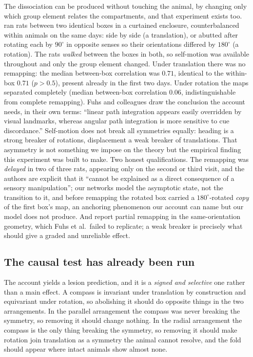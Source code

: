 The dissociation can be produced without touching the animal, by changing only which group element
relates the compartments, and that experiment exists too. \citet{fuhs2005} ran rats between two
identical boxes in a curtained enclosure, counterbalanced within animals on the same days: side by side
(a translation), or abutted after rotating each by $90^\circ$ in opposite senses so their orientations
differed by $180^\circ$ (a rotation). The rats \emph{walked} between the boxes in both, so self-motion
was available throughout and only the group element changed. Under translation there was no remapping:
the median between-box correlation was $0.71$, identical to the within-box $0.71$ ($p > 0.5$), present
already in the first two days. Under rotation the maps separated completely (median between-box
correlation $0.06$, indistinguishable from complete remapping). Fuhs and colleagues draw the conclusion
the account needs, in their own terms: ``linear path integration appears easily overridden by visual
landmarks, whereas angular path integration is more sensitive to cue discordance.'' Self-motion does
not break all symmetries equally: heading is a strong breaker of rotations, displacement a weak breaker
of translations. That asymmetry is not something we impose on the theory but the empirical finding this
experiment was built to make. Two honest qualifications. The remapping was
\emph{delayed} in two of three rats, appearing only on the second or third visit, and the authors are
explicit that it ``cannot be explained as a direct consequence of a sensory manipulation''; our networks
model the asymptotic state, not the transition to it, and before remapping the rotated box carried a
$180^\circ$-rotated \emph{copy} of the first box's map, an anchoring phenomenon our account can name
but our model does not produce. And \citet{skaggs1998} report partial remapping in the same-orientation
geometry, which Fuhs et al.\ failed to replicate; a weak breaker is precisely what should give a graded
and unreliable effect.

\subsection*{The causal test has already been run}

The account yields a lesion prediction, and it is a \emph{signed and selective} one rather than a main
effect. A compass is invariant under translation by construction and equivariant under rotation, so
abolishing it should do opposite things in the two arrangements. In the parallel arrangement the compass
was never breaking the symmetry, so removing it should change nothing. In the radial arrangement the
compass is the only thing breaking the symmetry, so removing it should make rotation join translation as
a symmetry the animal cannot resolve, and the fold should appear where intact animals show almost none.

